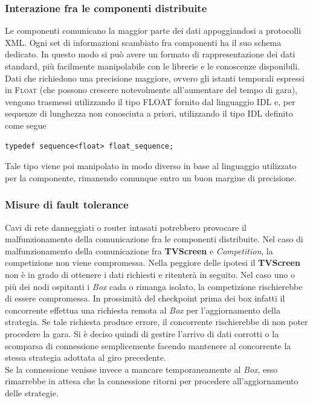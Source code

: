 \subsubsection{Interazione fra le componenti distribuite}
Le componenti comunicano la maggior parte dei dati appoggiandosi a protocolli XML. Ogni set di informazioni scambiato fra componenti ha il suo schema dedicato. In questo
modo si pu\`{o} avere un formato di rappresentazione dei dati standard, pi\`{u} facilmente manipolabile con le librerie e le conoscenze disponibili. 
Dati che richiedono una precisione maggiore, ovvero gli istanti temporali espressi in \textsc{Float} (che possono crescere notevolmente all'aumentare del tempo di gara),
vengono trasmessi utilizzando il tipo FLOAT fornito dal linguaggio IDL e, per sequenze di lunghezza non conosciuta a priori, utilizzando il tipo IDL definito come segue
\begin{lstlisting}
typedef sequence<float> float_sequence;
\end{lstlisting}
Tale tipo viene poi manipolato in modo diverso in base al linguaggio utilizzato per la componente, rimanendo comunque entro un buon margine di precisione.
\subsubsection{Misure di fault tolerance}
Cavi di rete danneggiati o router intasati potrebbero provocare il malfunzionamento della comunicazione fra le componenti distribuite. Nel caso di malfunzionamento
della comunicazione fra \textbf{TVScreen} e \emph{Competition}, la competizione non viene compromessa. Nella peggiore delle ipotesi il \textbf{TVScreen} non \`{e} in grado
di ottenere i dati richiesti e ritenter\`{a} in seguito. Nel caso uno o pi\`{u} dei nodi ospitanti i \emph{Box} cada o rimanga isolato, la competizione rischierebbe
di essere compromessa. In prossimit\`{a} del checkpoint prima dei box infatti il concorrente effettua una richiesta remota al \emph{Box} per l'aggiornamento della strategia.
Se tale richiesta produce errore, il concorrente rischierebbe di non poter procedere la gara. Si \`{e} deciso quindi di gestire l'arrivo di dati corrotti o la scomparsa di 
connessione semplicemente facendo mantenere al concorrente la stessa strategia adottata al giro precedente.\\
Se la connessione venisse invece a mancare temporaneamente al \emph{Box}, esso rimarrebbe in attesa che la connessione ritorni per procedere all'aggiornamento
delle strategie.
